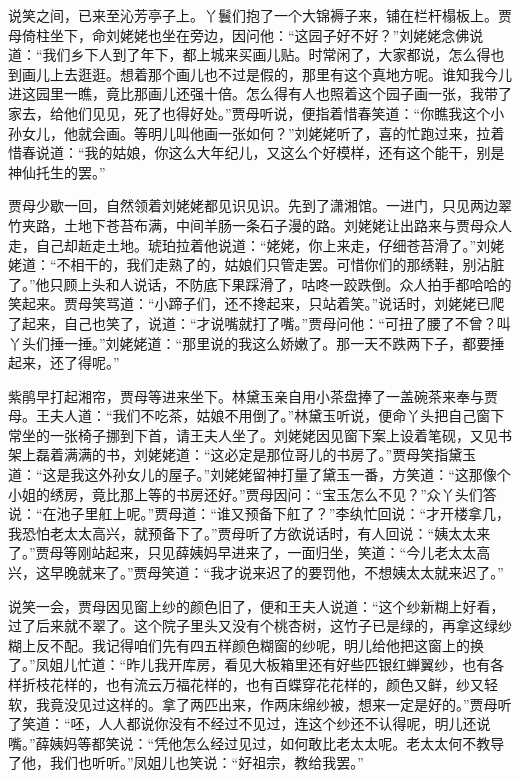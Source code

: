 说笑之间，已来至沁芳亭子上。丫鬟们抱了一个大锦褥子来，铺在栏杆榻板上。贾母倚柱坐下，命刘姥姥也坐在旁边，因问他：``这园子好不好？''刘姥姥念佛说道：``我们乡下人到了年下，都上城来买画儿贴。时常闲了，大家都说，怎么得也到画儿上去逛逛。想着那个画儿也不过是假的，那里有这个真地方呢。谁知我今儿进这园里一瞧，竟比那画儿还强十倍。怎么得有人也照着这个园子画一张，我带了家去，给他们见见，死了也得好处。''贾母听说，便指着惜春笑道：``你瞧我这个小孙女儿，他就会画。等明儿叫他画一张如何？''刘姥姥听了，喜的忙跑过来，拉着惜春说道：``我的姑娘，你这么大年纪儿，又这么个好模样，还有这个能干，别是神仙托生的罢。''

贾母少歇一回，自然领着刘姥姥都见识见识。先到了潇湘馆。一进门，只见两边翠竹夹路，土地下苍苔布满，中间羊肠一条石子漫的路。刘姥姥让出路来与贾母众人走，自己却赾走土地。琥珀拉着他说道：``姥姥，你上来走，仔细苍苔滑了。''刘姥姥道：``不相干的，我们走熟了的，姑娘们只管走罢。可惜你们的那绣鞋，别沾脏了。''他只顾上头和人说话，不防底下果踩滑了，咕咚一跤跌倒。众人拍手都哈哈的笑起来。贾母笑骂道：``小蹄子们，还不搀起来，只站着笑。''说话时，刘姥姥已爬了起来，自己也笑了，说道：``才说嘴就打了嘴。''贾母问他：``可扭了腰了不曾？叫丫头们捶一捶。''刘姥姥道：``那里说的我这么娇嫩了。那一天不跌两下子，都要捶起来，还了得呢。''

紫鹃早打起湘帘，贾母等进来坐下。林黛玉亲自用小茶盘捧了一盖碗茶来奉与贾母。王夫人道：``我们不吃茶，姑娘不用倒了。''林黛玉听说，便命丫头把自己窗下常坐的一张椅子挪到下首，请王夫人坐了。刘姥姥因见窗下案上设着笔砚，又见书架上磊着满满的书，刘姥姥道：``这必定是那位哥儿的书房了。''贾母笑指黛玉道：``这是我这外孙女儿的屋子。''刘姥姥留神打量了黛玉一番，方笑道：``这那像个小姐的绣房，竟比那上等的书房还好。''贾母因问：``宝玉怎么不见？''众丫头们答说：``在池子里舡上呢。''贾母道：``谁又预备下舡了？''李纨忙回说：``才开楼拿几，我恐怕老太太高兴，就预备下了。''贾母听了方欲说话时，有人回说：``姨太太来了。''贾母等刚站起来，只见薛姨妈早进来了，一面归坐，笑道：``今儿老太太高兴，这早晚就来了。''贾母笑道：``我才说来迟了的要罚他，不想姨太太就来迟了。''

说笑一会，贾母因见窗上纱的颜色旧了，便和王夫人说道：``这个纱新糊上好看，过了后来就不翠了。这个院子里头又没有个桃杏树，这竹子已是绿的，再拿这绿纱糊上反不配。我记得咱们先有四五样颜色糊窗的纱呢，明儿给他把这窗上的换了。''凤姐儿忙道：``昨儿我开库房，看见大板箱里还有好些匹银红蝉翼纱，也有各样折枝花样的，也有流云万福花样的，也有百蝶穿花花样的，颜色又鲜，纱又轻软，我竟没见过这样的。拿了两匹出来，作两床绵纱被，想来一定是好的。''贾母听了笑道：``呸，人人都说你没有不经过不见过，连这个纱还不认得呢，明儿还说嘴。''薛姨妈等都笑说：``凭他怎么经过见过，如何敢比老太太呢。老太太何不教导了他，我们也听听。''凤姐儿也笑说：``好祖宗，教给我罢。''

